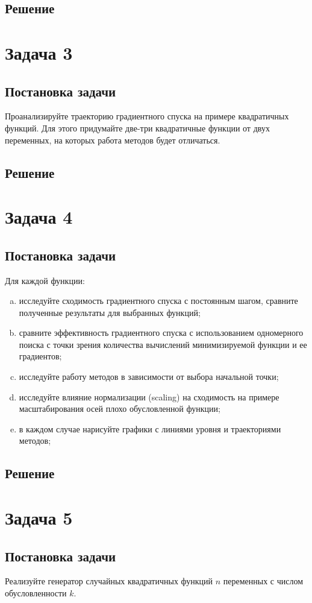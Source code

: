 \documentclass[12pt, a4paper, oneside]{article}
\begin{document}
	\subsection*{Решение}
	\section*{Задача 3}
	\subsection*{Постановка задачи}
	Проанализируйте траекторию градиентного спуска на примере квадратичных функций. Для этого придумайте две-три квадратичные функции от двух переменных, на которых работа методов будет отличаться.
	\subsection*{Решение}
	\section*{Задача 4}
	\subsection*{Постановка задачи}
	Для каждой функции:
	\begin{enumerate}[(a)]
		\item исследуйте сходимость градиентного спуска с постоянным шагом, сравните полученные результаты для выбранных функций;
		\item сравните эффективность градиентного спуска с использованием одномерного поиска с точки зрения количества вычислений минимизируемой функции и ее градиентов;
		\item исследуйте работу методов в зависимости от выбора начальной точки;
		\item исследуйте влияние нормализации (scaling) на сходимость на примере масштабирования осей плохо обусловленной функции;
		\item в каждом случае нарисуйте графики с линиями уровня и траекториями методов;
	\end{enumerate}
	\subsection*{Решение}
	\section*{Задача 5}
	\subsection*{Постановка задачи}
	Реализуйте генератор случайных квадратичных функций $n$ переменных с числом обусловленности $k$.
\end{document}
